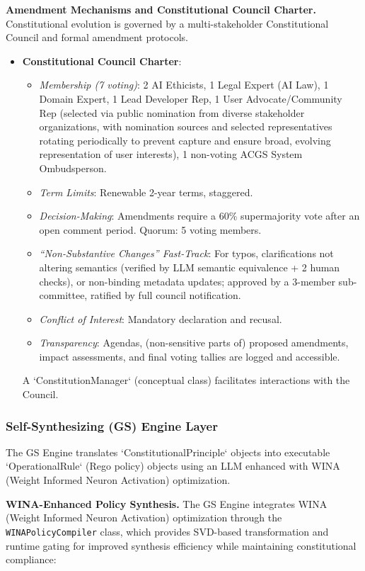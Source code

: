\documentclass[manuscript,screen,review,anonymous,9pt]{acmart}
\begin{document}
\textbf{Amendment Mechanisms and Constitutional Council Charter.} Constitutional evolution is governed by a multi-stakeholder Constitutional Council and formal amendment protocols.
\begin{itemize}
    \item \textbf{Constitutional Council Charter}:
    \begin{itemize}
        \item \textit{Membership (7 voting)}: 2 AI Ethicists, 1 Legal Expert (AI Law), 1 Domain Expert, 1 Lead Developer Rep, 1 User Advocate/Community Rep (selected via public nomination from diverse stakeholder organizations, with nomination sources and selected representatives rotating periodically to prevent capture and ensure broad, evolving representation of user interests), 1 non-voting ACGS System Ombudsperson.
        \item \textit{Term Limits}: Renewable 2-year terms, staggered.
        \item \textit{Decision-Making}: Amendments require a 60\% supermajority vote after an open comment period. Quorum: 5 voting members.
        \item \textit{``Non-Substantive Changes'' Fast-Track}: For typos, clarifications not altering semantics (verified by LLM semantic equivalence + 2 human checks), or non-binding metadata updates; approved by a 3-member sub-committee, ratified by full council notification.
        \item \textit{Conflict of Interest}: Mandatory declaration and recusal.
        \item \textit{Transparency}: Agendas, (non-sensitive parts of) proposed amendments, impact assessments, and final voting tallies are logged and accessible.
    \end{itemize}
    A `ConstitutionManager` (conceptual class) facilitates interactions with the Council.
\end{itemize}

\subsubsection{Self-Synthesizing (GS) Engine Layer}
The GS Engine translates `ConstitutionalPrinciple` objects into executable `OperationalRule` (Rego policy) objects using an LLM enhanced with WINA (Weight Informed Neuron Activation) optimization.

\textbf{WINA-Enhanced Policy Synthesis.} The GS Engine integrates WINA (Weight Informed Neuron Activation) optimization \cite{WINA2024NeuronActivation} through the \texttt{WINAPolicyCompiler} class, which provides SVD-based transformation and runtime gating for improved synthesis efficiency while maintaining constitutional compliance:
\end{document}
